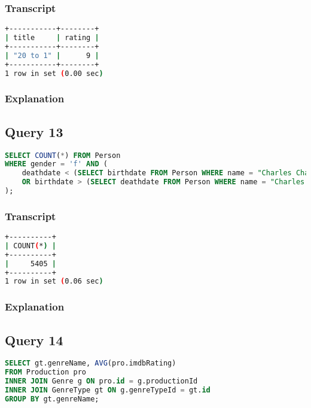 \subsubsection{Transcript}
\begin{lstlisting}[language=bash]
+-----------+--------+
| title     | rating |
+-----------+--------+
| "20 to 1" |      9 |
+-----------+--------+
1 row in set (0.00 sec)
\end{lstlisting}

\subsubsection{Explanation}


\subsection{Query 13}
\begin{lstlisting}[language=sql]
SELECT COUNT(*) FROM Person
WHERE gender = 'f' AND (
	deathdate < (SELECT birthdate FROM Person WHERE name = "Charles Chaplin")
	OR birthdate > (SELECT deathdate FROM Person WHERE name = "Charles Chaplin")
);
\end{lstlisting}

\subsubsection{Transcript}
\begin{lstlisting}[language=bash]
+----------+
| COUNT(*) |
+----------+
|     5405 |
+----------+
1 row in set (0.06 sec)
\end{lstlisting}

\subsubsection{Explanation}


\subsection{Query 14}
\begin{lstlisting}[language=sql]
SELECT gt.genreName, AVG(pro.imdbRating)
FROM Production pro
INNER JOIN Genre g ON pro.id = g.productionId
INNER JOIN GenreType gt ON g.genreTypeId = gt.id
GROUP BY gt.genreName;
\end{lstlisting}


